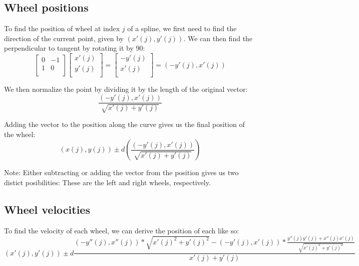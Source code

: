\documentclass[12pt, english]{article}
\begin{document}
\subsection{Wheel positions}
To find the position of wheel at index $j$ of a spline, we first need to find the direction of the current point, given by $(x'(j), y'(j))$. We can then find the perpendicular to tangent by rotating it by 90\degree: \\

\begin{equation}
	\begin{bmatrix}
		0 & -1 \\
		1 & 0 \\
	\end{bmatrix}
	\begin{bmatrix}
		x'(j)\\
		y'(j)\\
	\end{bmatrix}
	=
	\begin{bmatrix}
		-y'(j)\\
		x'(j)\\
	\end{bmatrix}
	= (-y'(j), x'(j)) 
\end{equation}

\noindent
We then normalize the point by dividing it by the length of the original vector: \\
\begin{equation}
	\label{deriv_speed_vec}
	\frac{(-y'(j), x'(j))}{\sqrt{x'(j)+y'(j)}}
\end{equation}

\noindent
Adding the vector to the position along the curve gives us the final position of the wheel:
\begin{equation}
	(x(j), y(j)) \pm d \left(\frac{(-y'(j), x'(j))}{\sqrt{x'(j)+y'(j)}}\right)
\end{equation}

\noindent
Note: Either subtracting or adding the vector from the position gives us two distict posibilities: These are the left and right wheels, respectively.

\subsection{Wheel velocities}
To find the velocity of each wheel, we can derive the position of each like so:
\begin{equation}
	(x'(j), y'(j)) \pm d\frac{(-y''(j), x''(j))*\sqrt{x'(j)^2+y'(j)^2} - (-y'(j), x'(j)) * \frac{y''(j)y'(j) + x''(j)x'(j)}{\sqrt{x'(j)^2+y'(j)^2}}}{x'(j)+y'(j)}
\end{equation}
\end{document}
